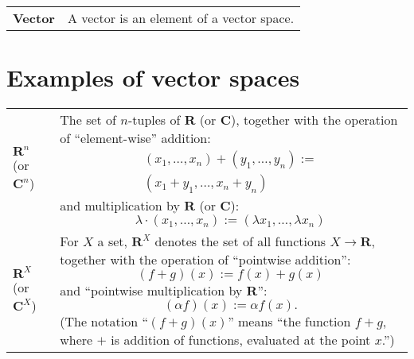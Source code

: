 \documentclass[10pt, a4paper, landscape]{article}
\newcommand{\defn}[1]{\textbf{#1}}
\newcommand{\set}[1]{\mathbold{#1}}
\begin{document}
\begin{multicols*}{3}
\begin{tabularx}{\columnwidth}{@{}l>{\raggedright\arraybackslash}X@{}}
  \defn{Vector} & A vector is an element of a vector space.
\end{tabularx}

\section*{Examples of vector spaces}
\begin{tabularx}{\columnwidth}{@{}l>{\raggedright\arraybackslash}X@{}}
  \toprule
  $\set{R}^n$ (or $\set{C}^n$) & The set of $n$-tuples of $\set{R}$ (or $\set{C}$), together with the operation of “element-wise” addition:
  \begin{multline*}
      (x_1, \dotsc, x_n) + (y_1, \dotsc, y_n) := \\ (x_1+y_1, \dotsc, x_n+y_n) 
  \end{multline*}
  and multiplication by $\set{R}$ (or $\set{C}$):
  \begin{equation*}
    \lambda \cdot (x_1, \dotsc, x_n) := (\lambda x_1, \dotsc, \lambda x_n) 
  \end{equation*} \\

  $\set{R}^X$ (or $\set{C}^X$) & For $X$ a set, $\set{R}^X$ denotes the set of all functions $X\to\mathbold{R}$, together with the operation of “pointwise addition”:
  \begin{equation*}
    (f+g)(x) := f(x) + g(x)
  \end{equation*}
  and “pointwise multiplication by $\mathbold{R}$”:
  \begin{equation*}
    (\alpha f)(x) := \alpha f(x).
  \end{equation*}
  (The notation “$(f+g)(x)$” means “the function $f+g$, where $+$ is addition of functions, evaluated at the point $x$.”)
    
\end{tabularx}

\end{multicols*}
\end{document}

